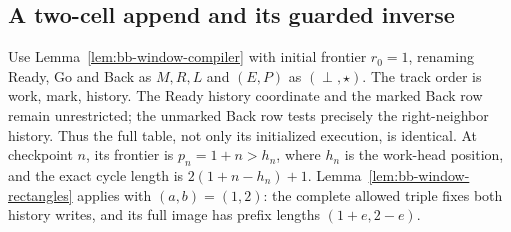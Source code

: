\subsection{A two-cell append and its guarded inverse}\label{bc:two-cell-section}
Use Lemma~\ref{lem:bb-window-compiler} with initial frontier $r_0=1$,
renaming Ready, Go and Back as $M,R,L$ and $(E,P)$ as
$(\perp,\star)$. The track order is work, mark, history.
The Ready history coordinate and the marked Back row remain unrestricted;
the unmarked Back row tests precisely the right-neighbor history.
Thus the full table, not only its initialized execution, is identical.
At checkpoint $n$, its frontier is $p_n=1+n>h_n$, where $h_n$ is
the work-head position, and the exact cycle length is $2(1+n-h_n)+1$.
Lemma~\ref{lem:bb-window-rectangles} applies with
$(a,b)=(1,2)$: the complete allowed triple fixes both history writes,
and its full image has prefix lengths $(1+e,2-e)$.

